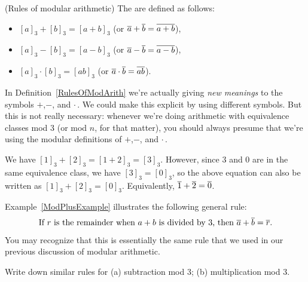 \begin{defn}\label{RulesOfModArith} (Rules of modular arithmetic)
The  are defined as follows:
\begin{itemize}
\item $[a]_3 + [b]_3 = [a+b]_3$ \qquad (or $\overline{a} + \overline{b} = \overline{a + b}$),
\item $[a]_3 - [b]_3 = [a-b]_3$ \qquad (or $\overline{a} - \overline{b} = \overline{a - b}$),
\item $[a]_3 \cdot [b]_3 = [ab]_3$ \qquad (or $\overline{a} \cdot \overline{b} = \overline{a  b}$).
\end{itemize}
\end{defn}

In Definition~\ref{RulesOfModArith} we're actually giving \emph{new meanings} to the symbols $+$,$-$, and $\cdot$\,. We could make this explicit by using different symbols. But this is not really necessary: whenever we're doing arithmetic with equivalence classes mod 3 (or mod $n$, for that matter), you should always presume that we're using the modular definitions of $+$,$-$, and $\cdot$\,.

\begin{eg}\label{ModPlusExample}
We have $[1]_3 + [2]_3 = [1 + 2]_3 = [3]_3$. However, since 3 and 0 are in the same equivalence class, we have $[3]_3 = [0]_3$, so the above equation can also be written as $[1]_3 + [2]_3 = [0]_3$. Equivalently, $\overline{1} + \overline{2} = \overline{0}$.
\end{eg}

Example~\ref{ModPlusExample} illustrates the following general rule:
$$ \text{%
 If $r$ is the remainder when $a + b$ is divided by $3$, then $\class{a} + \class{b} = \class{r}$.} $$
You may recognize that this is essentially the same rule that we used in our previous discussion of modular arithmetic.

\begin{exercise}{47}
Write down similar rules for (a) subtraction mod 3; (b) multiplication mod 3.
\end{exercise}

